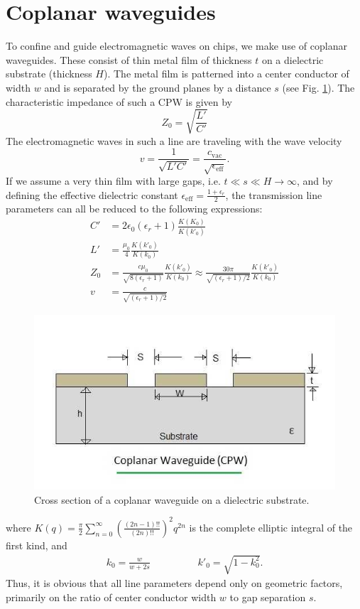 \section{Coplanar waveguides}
To confine and guide electromagnetic waves on chips, we make use of coplanar waveguides.
These consist of thin metal film of thickness $t$ on a dielectric substrate (thickness $H$).
The metal film is patterned into a center conductor of width $w$ and is separated by the ground planes by a distance $s$ (see Fig. \ref{fig:cpw-coplanar-waveguide}).
The characteristic impedance of such a CPW is given by
\begin{equation}
Z_0 = \sqrt{\frac{L'}{C'}}
\end{equation}
The electromagnetic waves in such a line are traveling with the wave velocity \begin{equation}
v=\frac{1}{\sqrt{L'C'}}=\frac{c_\mathrm{vac}}{\sqrt{\epsilon_\mathrm{eff}}}.
\end{equation}
If we assume a very thin film with large gaps, i.e. $t \ll s \ll H \rightarrow \infty$, and by defining the effective dielectric constant $\epsilon_\mathrm{eff} = \frac{1+\epsilon_r}{2}$, the transmission line parameters can all be reduced to the following expressions:
\begin{align}
C' &= 2\epsilon_0(\epsilon_r+1)\frac{K(K_0)}{K(k'_0)} \\%
L' &= \frac{\mu_0}{4}\frac{K(k'_0)}{K(k_0)} \\%
Z_0 &= \frac{c\mu_0}{\sqrt{8(\epsilon_r+1)}}\frac{K(k'_0)}{K(k_0)}\approx \frac{30\pi}{\sqrt{(\epsilon_r+1)/2}}\frac{K(k'_0)}{K(k_0)} \\%
v &= \frac{c}{\sqrt{(\epsilon_r+1)/2}}
\end{align}
\begin{figure}
	\centering
	\includegraphics[width=0.3\linewidth]{chapter-theory/figs-RF/CPW-Coplanar-Waveguide.jpg}
	\caption{Cross section of a coplanar waveguide on a dielectric substrate.}
	\label{fig:cpw-coplanar-waveguide}
\end{figure}
where $K(q) = \frac{\pi}{2}\sum_{n=0}^{\infty}\left(\frac{(2n-1)!!}{(2n)!!}\right)^2 q^{2n}$ is the complete elliptic integral of the first kind, and
\begin{align}
k_0 = \frac{w}{w+2s} \hspace{2cm} k'_0 = \sqrt{1-k_0^2}.
\end{align}
Thus, it is obvious that all line parameters depend only on geometric factors, primarily on the ratio of center conductor width $w$ to gap separation $s$.


